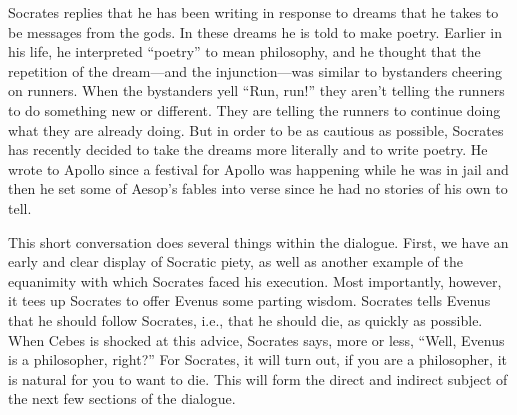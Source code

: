 \documentclass[12pt,letterpaper]{article}
\begin{document}
Socrates replies that he has been writing in response to dreams that he takes to be messages from the gods. In these dreams he is told to make poetry. Earlier in his life, he interpreted ``poetry'' to mean philosophy, and he thought that the repetition of the dream---and the injunction---was similar to bystanders cheering on runners. When the bystanders yell ``Run, run!'' they aren't telling the runners to do something new or different. They are telling the runners to continue doing what they are already doing. But in order to be as cautious as possible, Socrates has recently decided to take the dreams more literally and to write poetry. He wrote to Apollo since a festival for Apollo was happening while he was in jail and then he set some of Aesop's fables into verse since he had no stories of his own to tell.

This short conversation does several things within the dialogue. First, we have an early and clear display of Socratic piety, as well as another example of the equanimity with which Socrates faced his execution. Most importantly, however, it tees up Socrates to offer Evenus some parting wisdom. Socrates tells Evenus that he should follow Socrates, i.e., that he should die, as quickly as possible. When Cebes is shocked at this advice, Socrates says, more or less, ``Well, Evenus is a philosopher, right?'' For Socrates, it will turn out, if you are a philosopher, it is natural for you to want to die. This will form the direct and indirect subject of the next few sections of the dialogue.


\newpage
\printbibliography
\end{document}
